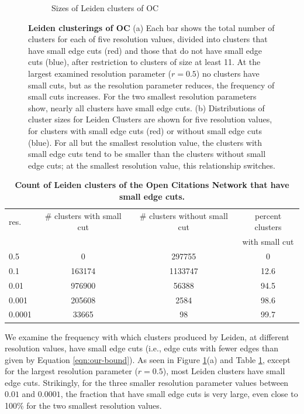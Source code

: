 \documentclass[11pt]{article}   	%
\begin{document}
\begin{figure}[H]
\begin{subfigure}[t]{0.45\textwidth}
\begin{center}
\caption{Sizes of Leiden clusters of OC}
\end{center}
\end{subfigure}
\caption{\textbf {Leiden clusterings of OC} (a)
Each bar shows the total number of clusters for each of five resolution values, divided into clusters that have small edge cuts (red)  and those that do not have small edge cuts (blue), after restriction  to clusters of size at least 11. At the largest examined resolution parameter ($r=0.5$) no clusters have small cuts, but  as the resolution parameter reduces, the frequency of  small cuts increases.
For the two smallest resolution parameters show, nearly all clusters have small edge cuts.
(b)  Distributions of cluster sizes  for Leiden Clusters are shown for five resolution values, for clusters with small edge cuts (red) or without small edge cuts (blue). For all but the smallest resolution value, the clusters with small edge cuts tend to be smaller than the clusters without small edge cuts; at the smallest resolution value, this relationship switches.}
\label{fig:ocistouched-leiden}
\end{figure}



\begin{table}[ht]
\centering
\begin{tabular}{lccc}
  \hline
 res. & \# clusters with small cut & \# clusters without  small cut & percent clusters   \\
 & & & with small cut \\
  \hline
  0.5 & 0 & 297755 & 0 \\
   0.1 & 163174 & 1133747 & 12.6  \\
    0.01 & 976900 & 56388 & 94.5\\
    0.001 & 205608 & 2584 & 98.6 \\
   0.0001 & 33665 &  98 & 99.7 \\
   \hline
\end{tabular}
\caption{\textbf{Count of Leiden clusters of the Open Citations Network that have small edge cuts.}}
\label{tab:ocistouched-part1}
\end{table}


We examine the frequency with which clusters produced by Leiden, at different resolution values, have small edge cuts  (i.e., edge cuts with fewer edges than given by Equation \ref{eqn:our-bound}).
As seen in Figure  \ref{fig:ocistouched-leiden}(a) and Table \ref{tab:ocistouched-part1}, except for the largest resolution parameter ($r=0.5$), most Leiden clusters have small edge cuts.
Strikingly, for the three smaller resolution parameter values between $0.01$ and $0.0001$, the fraction that have small edge cuts   is very large, even close to 100\% for the two smallest resolution values.
\end{document}
